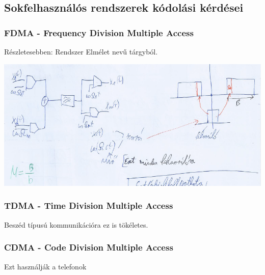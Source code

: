 \subsection{Sokfelhasználós rendszerek kódolási kérdései}

\subsubsection{FDMA - Frequency Division Multiple Access}
	Részletesebben: Rendszer Elmélet nevű tárgyból.

	\begin{center}
		\includegraphics[scale=0.8]{img/FDMA}
	\end{center}

\subsubsection{TDMA - Time Division Multiple Access}

	Beszéd típusú kommunikációra ez is tökéletes.

\subsubsection{CDMA - Code Division Multiple Access}
	Ezt használják a telefonok

